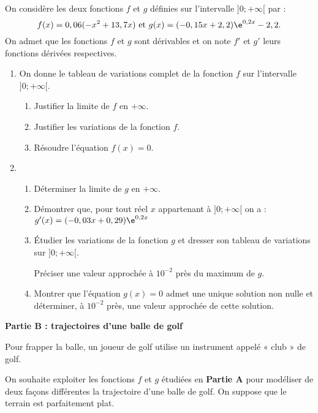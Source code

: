 On considère les deux fonctions $f$ et $g$ définies sur l’intervalle $]0;+\infty[$ par : \[ f(x)=0,06(-x^2+13,7x) \text{ et } g(x)=(-0,15x + 2,2)\e^{0,2x} - 2,2.\]
%
On admet que les fonctions $f$ et $g$ sont dérivables et on note $f'$ et $g'$ leurs fonctions dérivées respectives.

\begin{enumerate}
	\item On donne le tableau de variations complet de la fonction $f$ sur l’intervalle $]0;+\infty[$.
	
	\begin{center}
	\end{center}
	\begin{enumerate}
		\item Justifier la limite de $f$ en $+\infty$.
		\item Justifier les variations de la fonction $f$.
		\item Résoudre l’équation $f(x)=0$.
	\end{enumerate}
	\item 
	\begin{enumerate}
		\item Déterminer la limite de $g$ en $+\infty$.
		\item Démontrer que, pour tout réel $x$ appartenant à $]0;+\infty[$ on a : $g'(x)=(-0,03x + 0,29)\e^{0,2x}$
		\item Étudier les variations de la fonction $g$ et dresser son tableau de variations sur $]0;+\infty[$.
		
		Préciser une valeur approchée à $10^{-2}$ près du maximum de $g$.
		\item Montrer que l'équation $g(x)=0$ admet une unique solution non nulle et déterminer, à $10^{-2}$ près, une valeur approchée de cette solution.
	\end{enumerate}
\end{enumerate}

\begin{center}
	\textbf{Partie B : trajectoires d’une balle de golf}
\end{center}

Pour frapper la balle, un joueur de golf utilise un instrument appelé « club » de golf.

On souhaite exploiter les fonctions $f$ et $g$ étudiées en \textbf{Partie A} pour modéliser de deux façons différentes la trajectoire d'une balle de golf. On suppose que le terrain est parfaitement plat.

